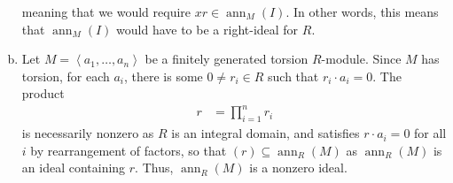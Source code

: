 \documentclass[10pt]{mypackage}
\begin{document}
\begin{solution}
\begin{enumerate}[(a)]
      meaning that we would require $xr\in \operatorname{ann}_M(I)$. In other words, this means that $\operatorname{ann}_M(I)$ would have to be a right-ideal for $R$.
    \item Let $M = \left\langle a_1,\dots,a_n \right\rangle$ be a finitely generated torsion $R$-module. Since $M$ has torsion, for each $a_i$, there is some $0\neq r_i\in R$ such that $r_i\cdot a_i = 0$. The product
      \begin{align*}
        r &= \prod_{i=1}^{n}r_i
      \end{align*}
      is necessarily nonzero as $R$ is an integral domain, and satisfies $r\cdot a_i = 0$ for all $i$ by rearrangement of factors, so that $\left( r \right)\subseteq \operatorname{ann}_{R}\left( M \right)$ as $\operatorname{ann}_R\left( M \right)$ is an ideal containing $r$. Thus, $\operatorname{ann}_R\left( M \right)$ is a nonzero ideal.
  \end{enumerate}
\end{solution}
\end{document}
